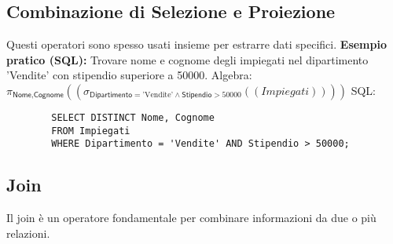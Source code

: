 \documentclass{article}
\newcommand{\Rel}[1]{\textit{#1}} %
\newcommand{\Attr}[1]{\textsf{#1}} %
\newcommand{\myselectop}[2]{\sigma_{#1}(#2)}
\newcommand{\myproject}[2]{\pi_{#1}(#2)}
\newcommand{\mylandop}{\wedge}
\begin{document}
	\subsection{Combinazione di Selezione e Proiezione}
	Questi operatori sono spesso usati insieme per estrarre dati specifici.
	\textbf{Esempio pratico (SQL):} Trovare nome e cognome degli impiegati nel dipartimento 'Vendite' con stipendio superiore a 50000.
	Algebra: $\myproject{\Attr{Nome}, \Attr{Cognome}}{(\myselectop{\Attr{Dipartimento} = \text{'Vendite'} \mylandop \Attr{Stipendio} > 50000}{(\Rel{Impiegati})})}$
	SQL:
	\begin{verbatim}
		SELECT DISTINCT Nome, Cognome
		FROM Impiegati
		WHERE Dipartimento = 'Vendite' AND Stipendio > 50000;
	\end{verbatim}
	
	\subsection{Join}
	Il join è un operatore fondamentale per combinare informazioni da due o più relazioni.
\end{document}
